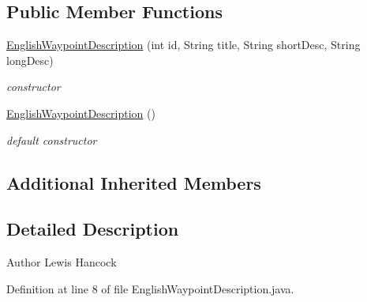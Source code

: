 \subsection*{Public Member Functions}
\begin{DoxyCompactItemize}
\item 
\hyperlink{classuk_1_1ac_1_1swan_1_1digitaltrails_1_1components_1_1_english_waypoint_description_af1a019a4e5496a032f2fe66192f106ef}{English\+Waypoint\+Description} (int id, String title, String short\+Desc, String long\+Desc)
\begin{DoxyCompactList}\small\item\em constructor \end{DoxyCompactList}\item 
\hyperlink{classuk_1_1ac_1_1swan_1_1digitaltrails_1_1components_1_1_english_waypoint_description_aca73e7b961e066f23d130939564d5be5}{English\+Waypoint\+Description} ()
\begin{DoxyCompactList}\small\item\em default constructor \end{DoxyCompactList}\end{DoxyCompactItemize}
\subsection*{Additional Inherited Members}


\subsection{Detailed Description}
\begin{DoxyAuthor}{Author}
Lewis Hancock 
\end{DoxyAuthor}


Definition at line 8 of file English\+Waypoint\+Description.\+java.



